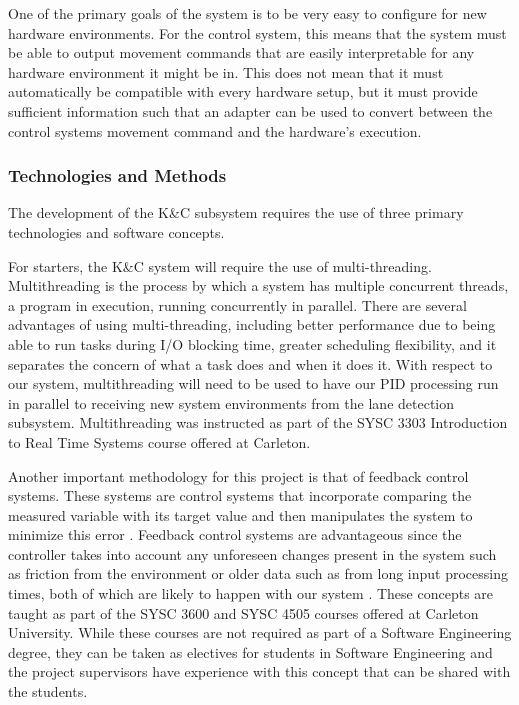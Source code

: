 \documentclass[titlepage, draft]{article}
\begin{document}
{\begin{itemize}
	      One of the primary goals of the system is to be very easy to configure for new hardware environments. For the control system, this means that the system must be able to output movement commands that are easily interpretable for any hardware environment it might be in. This does not mean that it must automatically be compatible with every hardware setup, but it must provide sufficient information such that an adapter can be used to convert between the control systems movement command and the hardware's execution.
\end{itemize}


\subsubsection{Technologies and Methods}
The development of the K\&C subsystem requires the use of three primary technologies and software concepts.

For starters, the K\&C system will require the use of multi-threading. Multithreading is the process by which a system has multiple concurrent threads, a program in execution, running concurrently in parallel. There are several advantages of using multi-threading, including better performance due to being able to run tasks during I/O blocking time, greater scheduling flexibility, and it separates the concern of what a task does and when it does it. With respect to our system, multithreading will need to be used to have our PID processing run in parallel to receiving new system environments from the lane detection subsystem. Multithreading was instructed as part of the SYSC 3303 Introduction to Real Time Systems course offered at Carleton.

Another important methodology for this project is that of feedback control systems. These systems are control systems that incorporate comparing the measured variable with its target value and then manipulates the system to minimize this error \cite{intro_to_feedback_sys}. Feedback control systems are advantageous since the controller takes into account any unforeseen changes present in the system such as friction from the environment or older data such as from long input processing times, both of which are likely to happen with our system \cite{intro_to_feedback_sys}. These concepts are taught as part of the SYSC 3600 and SYSC 4505 courses offered at Carleton University. While these courses are not required as part of a Software Engineering degree, they can be taken as electives for students in Software Engineering and the project supervisors have experience with this concept that can be shared with the students.

}
\end{document}
